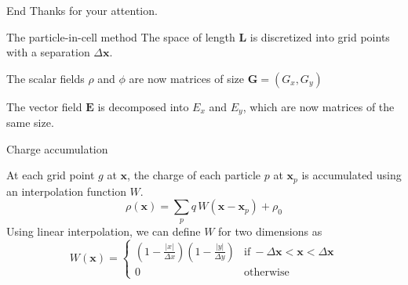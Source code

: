 \documentclass{beamer}
\newcommand{\backupbegin}{
   \newcounter{finalframe}
   \setcounter{finalframe}{\value{framenumber}}
}
\newcommand*\V[1]{\bm{#1}}
\newcommand{\E}{\V{E}}
\newcommand{\x}{\V{x}}
\begin{document}
\begin{frame}{End}
\centering
Thanks for your attention.
\end{frame}






























\backupbegin

\begin{frame}{The particle-in-cell method}{}
The space of length $\V L$ is discretized into grid points with a separation 
$\Delta \x$.

\vspace{1em}
The scalar fields $\rho$ and $\phi$ are now matrices of size $\V G = (G_x, G_y)$

\vspace{1em}
The vector field $\E$ is decomposed into $E_x$ and $E_y$, which are now matrices 
of the same size.

\end{frame}

\begin{frame}{Charge accumulation}{}

At each grid point $g$ at $\x$, the charge of each particle $p$ at $\x_p$ is 
accumulated using an interpolation function $W$.
\begin{equation}%
\rho(\x) = \sum_p q\,W(\x - \x_p) + \rho_0
\label{eq:charge-accumulation}
\end{equation}%
Using linear interpolation, we can define $W$ for two dimensions as
\begin{equation}%
W(\x) =
\begin{cases}
			\displaystyle\left(1 - \frac{|x|}{\Delta x}\right)
				\left(1 - \frac{|y|}{\Delta y}\right) & \text{if}\ -\Delta\x < \x < 
				\Delta \x\\
			0 & \text{otherwise}
\end{cases}
\end{equation}%
\end{frame}
\end{document}
